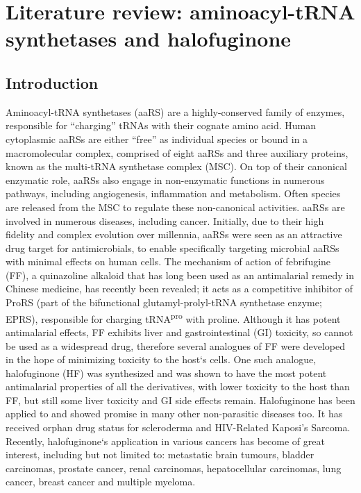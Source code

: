 \chapter{\label{ch:2-litreview}Literature review: aminoacyl-tRNA synthetases and halofuginone}

\section{Introduction}
Aminoacyl-tRNA synthetases (aaRS) are a highly-conserved family of enzymes, responsible for ``charging'' tRNAs with their cognate amino acid\cite{pouplana2020}.
Human cytoplasmic aaRSs are either ``free'' as individual species or bound in a macromolecular complex, comprised of eight aaRSs and three auxiliary proteins, known as the multi-tRNA synthetase complex (MSC)\cite{pouplana2020}.
On top of their canonical enzymatic role, aaRSs also engage in non-enzymatic functions in numerous pathways, including angiogenesis, inflammation and metabolism.
Often species are released from the MSC to regulate these non-canonical activities\cite{kim2019evolution}.
aaRSs are involved in numerous diseases, including cancer.
Initially, due to their high fidelity and complex evolution over millennia, aaRSs were seen as an attractive drug target for antimicrobials, to enable specifically targeting microbial aaRSs with minimal effects on human cells.
The mechanism of action of febrifugine (FF), a quinazoline alkaloid that has long been used as an antimalarial remedy in Chinese medicine, has recently been revealed; it acts as a competitive inhibitor of ProRS (part of the bifunctional glutamyl-prolyl-tRNA synthetase enzyme; EPRS), responsible for charging tRNA\textsuperscript{pro} with proline.
Although it has potent antimalarial effects, FF exhibits liver and gastrointestinal (GI) toxicity, so cannot be used as a widespread drug, therefore several analogues of FF were developed in the hope of minimizing toxicity to the host`s cells.
One such analogue, halofuginone (HF) was synthesized and was shown to have the most potent antimalarial properties of all the derivatives, with lower toxicity to the host than FF, but still some liver toxicity and GI side effects remain\cite{zhang2017novel}.
Halofuginone has been applied to and showed promise in many other non-parasitic diseases too.
It has received orphan drug status for scleroderma and HIV-Related Kaposi's Sarcoma\cite{pines2015halofuginone}.
Recently, halofuginone`s application in various cancers has become of great interest, including but not limited to: metastatic brain tumours, bladder carcinomas, prostate cancer, renal carcinomas, hepatocellular carcinomas, lung cancer, breast cancer and multiple myeloma\cite{abramovitch2004halofuginone, elkin1999inhibition, gavish2002growth, nagler2004suppression, demiroglu2020anticarcinogenic, leiba2012halofuginone}.


